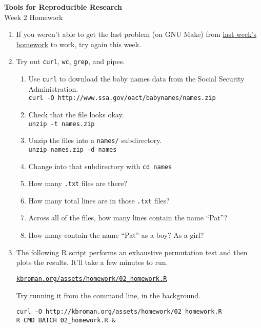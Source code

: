 \documentclass[12pt]{article}
\newcommand{\ttsm}{\tt \small}
\begin{document}
\thispagestyle{empty}

\textbf{Tools for Reproducible Research} \\
Week 2 Homework

\bigskip

\begin{enumerate}

\item If you weren't able to get the last problem (on GNU Make) from
  \href{http://kbroman.org/Tools4RR/assets/homework/01_homework.pdf}{last week's homework}
  to work, try again this week.

\item Try out {\ttsm curl}, {\ttsm wc}, {\ttsm grep}, and pipes.

  \begin{enumerate}
  \item Use {\ttsm curl} to download the baby names data from the
    Social Security Administration. \\
    {\ttsm curl -O http://www.ssa.gov/oact/babynames/names.zip}

  \item Check that the file looks okay.\\
    {\ttsm unzip -t names.zip}

  \item Unzip the files into a {\ttsm names/} subdirectory.\\
    {\ttsm unzip names.zip -d names}

  \item Change into that subdirectory with {\ttsm cd names}

  \item How many {\ttsm .txt} files are there?

  \item How many total lines are in those {\ttsm .txt} files?

  \item Across all of the files, how many lines contain the name
    ``Pat''?

  \item How many contain the name ``Pat'' as a boy? As a girl?
  \end{enumerate}


\item The following R script performs an exhaustive permutation test and
  then plots the results. It'll take a few minutes to run.

  \href{http://kbroman.org/assets/homework/02_homework.R}{\ttsm kbroman.org/assets/homework/02\_homework.R}

  Try running it from the command line, in the background.

  {\ttsm curl -O http://kbroman.org/assets/homework/02\_homework.R} \\
  {\ttsm R CMD BATCH 02\_homework.R \&}

\end{enumerate}
\end{document}
